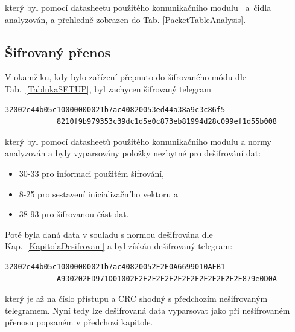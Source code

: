 který byl pomocí datasheetu použitého komunikačního modulu~\cite{ModulIQRF} a~čidla~\cite{CidloWeptech} analyzován, a přehledně zobrazen do Tab. \ref{PacketTableAnalysis}.

\subsection{Šifrovaný přenos}

V okamžiku, kdy bylo zařízení přepnuto do šifrovaného módu dle Tab.~\ref{TablukaSETUP}, byl zachycen šifrovaný telegram

\begin{lstlisting}[style=MyCodePHP]
			32002e44b05c10000000021b7ac40820053ed44a38a9c3c86f5
			8210f9b979353c39dc1d5e0c873eb81994d28c099ef1d55b008
\end{lstlisting}

který byl pomocí datasheetů použitého komunikačního modulu \cite{ModulIQRF} a normy~\cite{Norma1,NormaFIPS} analyzován a byly vyparsovány položky nezbytné pro dešifrování dat:
\begin{itemize}
	\item 30-33 pro informaci použitém šifrování,
	\item 8-25 pro sestavení inicializačního vektoru a
	\item 38-93 pro šifrovanou část dat.
\end{itemize}

Poté byla daná data v souladu s normou \cite{NormaFIPS} dešifrována dle Kap.~\ref{KapitolaDesifrovani} a byl získán dešifrovaný telegram:

\begin{lstlisting}[style=MyCodePHP]
			32002e44b05c10000000021b7ac40820052F2F0A6699010AFB1
			A930202FD971D01002F2F2F2F2F2F2F2F2F2F2F2F2F879e0D0A
\end{lstlisting}

který je až na číslo přístupu a CRC shodný s předchozím nešifrovaným telegramem. Nyní tedy lze dešifrovaná data vyparsovat jako při nešifrovaném přenosu popsaném v předchozí kapitole.

